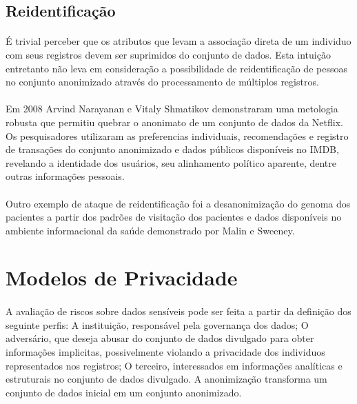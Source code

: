 \subsection{Reidentificação}

\paragraph{} É trivial perceber que os atributos que levam a associação direta de um individuo com seus registros devem ser suprimidos do conjunto de dados. Esta intuição entretanto não leva em consideração a possibilidade de reidentificação de pessoas no conjunto anonimizado através do processamento de múltiplos registros.

\paragraph{} Em 2008 Arvind Narayanan e Vitaly Shmatikov demonstraram uma metologia robusta\cite{netflixDeanon}  que permitiu quebrar o anonimato de um conjunto de dados da Netflix. Os pesquisadores utilizaram as preferencias individuais, recomendações e registro de transações do conjunto anonimizado e dados públicos disponíveis no IMDB, revelando a identidade dos usuários, seu alinhamento político aparente, dentre outras informações pessoais.

\paragraph{} Outro exemplo de ataque de reidentificação foi a desanonimização do genoma dos pacientes a partir dos padrões de visitação dos pacientes e dados disponíveis no ambiente informacional da saúde demonstrado por Malin e Sweeney\cite{malin2004}.

\section{Modelos de Privacidade}

\paragraph{} A avaliação de riscos sobre dados sensíveis pode ser feita a partir da definição dos seguinte perfis: A instituição, responsável pela governança dos dados; O adversário, que deseja abusar do conjunto de dados divulgado para obter informações implicitas, possivelmente violando a privacidade dos individuos representados nos registros; O terceiro, interessados em informações analíticas e estruturais no conjunto de dados divulgado. A anonimização transforma um conjunto de dados inicial em um conjunto anonimizado.

